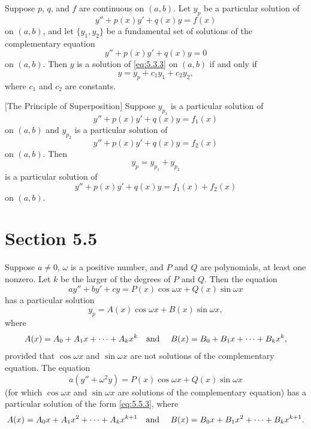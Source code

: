 \setcounter{theorem}{1}
\setcounter{equation}{2}
\begin{theorem}
  \label{thmtype:5.3.2} Suppose $p$, $q$, and $f$ are continuous on $(a,b)$. Let $y_{p}$ be a
  particular solution of
  \begin{equation}
    \label{eq:5.3.3}y''+p(x)y'+q(x)y=f(x)
  \end{equation}
  on $(a,b)$, and let $\{y_{1},y_{2}\}$ be a fundamental set of solutions of the complementary
  equation
  \begin{equation}
    \label{eq:5.3.4}y''+p(x)y'+q(x)y=0
  \end{equation}
  on $(a,b)$. Then $y$ is a solution of \eqref{eq:5.3.3} on $(a,b)$ if and only if
  \begin{equation}
    \label{eq:5.3.5}y=y_{p}+c_{1}y_{1}+c_{2}y_{2},
  \end{equation}
  where $c_{1}$ and $c_{2}$ are constants.
\end{theorem}

\setcounter{theorem}{2}
\begin{theorem}
  $[$The Principle of Superposition$]$ \label{thmtype:5.3.3} Suppose $y_{p_{1}}$ is a particular
  solution of
  \[
    y''+p(x)y'+q(x)y=f_{1}(x)
  \]
  on $(a,b)$ and $y_{p_{2}}$ is a particular solution of
  \[
    y''+p(x)y'+q(x)y=f_{2}(x)
  \]
  on $(a,b)$. Then
  \[
    y_{p}=y_{p_{1}}+y_{p_{2}}
  \]
  is a particular solution of
  \[
    y''+p(x)y'+q(x)y=f_{1}(x)+f_{2}(x)
  \]
  on $(a,b)$.
\end{theorem}

\section*{Section 5.5}
\setcounter{chapter}{5}
\setcounter{section}{5}

\setcounter{theorem}{0}
\setcounter{equation}{2}
\begin{theorem}
  \label{thmtype:5.5.1} Suppose $a\ne0$, $\omega$ is a positive number, and $P$ and $Q$ are polynomials, at least one nonzero. Let
  $k$ be the larger of the degrees of $P$ and $Q$. Then the equation
  \[
    ay''+by'+cy=P(x)\cos\omega x+Q(x)\sin\omega x
  \]
  has a particular solution
  \begin{equation}
    \label{eq:5.5.3}y_{p}=A(x)\cos\omega x+B(x)\sin\omega x,
  \end{equation}
  where
  \[
    A(x)=A_{0}+A_{1}x+\cdots+A_{k}x^{k}\mbox{\quad and \quad}B(x)=B_{0}+B_{1}x+\cdots+B_{k}x^{k},
  \]
  provided that $\cos\omega x$ and $\sin\omega x$ are not solutions of the complementary equation.
  The equation
  \[
    a(y''+\omega^{2}y)=P(x)\cos\omega x+Q(x)\sin\omega x
  \]
  (for which $\cos\omega x$ and $\sin\omega x$ are solutions of the complementary equation) has a particular solution
  of the form \eqref{eq:5.5.3}, where
  \[
    A(x)=A_{0}x+A_{1}x^{2}+\cdots+A_{k}x^{k+1}\mbox{\quad and \quad}B(x)=B_{0}x+B_{1}x^{2}+\cdots+B_{k}x^{k+1}.
  \]
\end{theorem}

